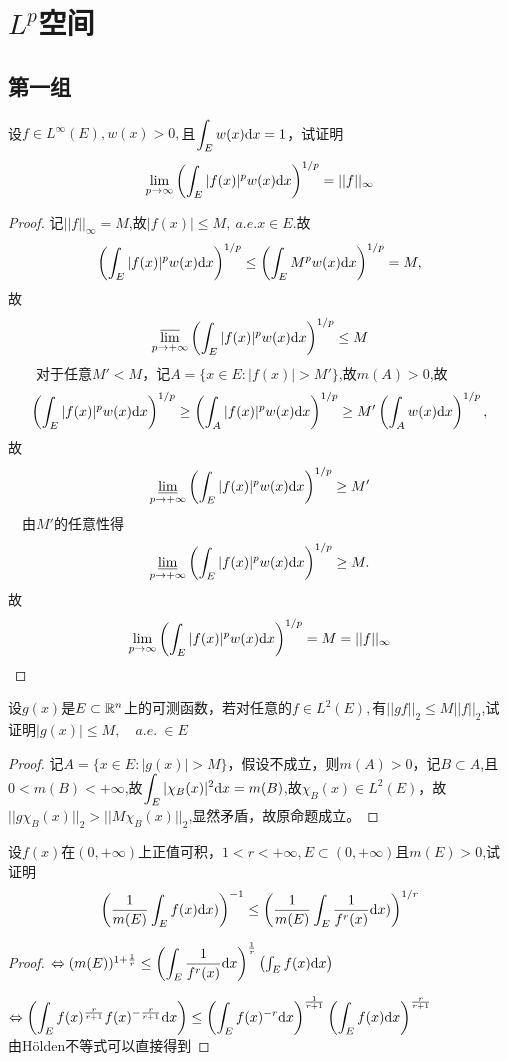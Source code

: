 \chapter{\emph{$L^p$}空间}
\section{第一组}
设$f\in L^{\infty}(E),w(x)>0,$且$\displaystyle{\int_E w(x) \mathrm{d}x=1}$，试证明$$\lim\limits_{p\to \infty}\left( \int_E |f(x)|^p w(x)\mathrm{d}x\right)^{1/p}=||f||_{\infty} $$
\begin{proof}
	记$||f||_{\infty}=M$,故$|f(x)|\leq M,\ a.e. x\in E$.故$$\left( \int_E |f(x)|^pw(x)\mathrm{d}x\right)^{1/p}\leq \left( \int_E M^pw(x)\mathrm{d}x\right)^{1/p}=M,$$故$$\displaystyle{\varlimsup\limits_{p \to +\infty}\left( \int_E |f(x)|^p w(x)\mathrm{d}x\right)^{1/p}\leq M} $$$\qquad $对于任意$M'<M$，记$A=\{x\in E:|f(x)|>M'\}$,故$m(A)>0$,故$$\left( \int_E |f(x)|^p w(x)\mathrm{d}x\right)^{1/p}\geq \left( \int_A |f(x)|^p w(x)\mathrm{d}x\right)^{1/p}\geq M'\left( \int_A  w(x)\mathrm{d}x\right)^{1/p},$$故$$\varliminf\limits_{p \to +\infty}\left( \int_E |f(x)|^p w(x)\mathrm{d}x\right)^{1/p}\geq M'$$$\quad$由$M'$的任意性得$$\varliminf\limits_{p \to +\infty}\left( \int_E |f(x)|^p w(x)\mathrm{d}x\right)^{1/p}\geq M.$$故$$\lim\limits_{p\to \infty}\left( \int_E |f(x)|^p w(x)\mathrm{d}x\right)^{1/p}=M=||f||_{\infty} $$
\end{proof}
设$g(x)$是$E\subset \mathbb{R}^{n}$上的可测函数，若对任意的$f\in L^2(E),$有$||gf||_2\leq M||f||_2$,试证明$|g(x)|\leq M,\quad a.e.\ \in E $
\begin{proof}
	记$A=\{x\in E:|g(x)|>M\}$，假设不成立，则$m(A)>0$，记$B\subset A$,且$0<m(B)<+\infty$,故$\displaystyle{\int_E|\chi_B(x)|^2\mathrm{d}x=m(B)}$,故$\chi_B(x)\in L^2(E)$，故$||g\chi_B(x)||_2> ||M\chi_B(x)||_2$,显然矛盾，故原命题成立。
\end{proof}

设$f(x)$在$(0,+\infty)$上正值可积，$1<r<+\infty, E\subset (0,+\infty)$且$m(E)>0$,试证明$$\left( \displaystyle{\frac{1}{m(E)}\int_E f(x) \mathrm{d}x)}\right)^{-1}\leq  \left( \displaystyle{\frac{1}{m(E)}\int_E \frac{1}{f^r(x)} \mathrm{d}x)}\right)^{1/r}$$
\begin{proof}
	$\Leftrightarrow (m(E))^{1+\frac{1}{r}}\leq \left( \displaystyle{\int_E \frac{1}{f^r(x)}\mathrm{d}x } \right)^{\frac{1}{r}}\left(\int_E f(x)  \mathrm{d}x \right)  $\par 
	$\Leftrightarrow\displaystyle{ \left( \int_E f(x) ^{\frac{r}{r+1}}  f(x) ^{-\frac{r}{r+1}} \mathrm{d}x \right)\leq \left(\int_E  f(x) ^{-r}  \mathrm{d}x \right)^{\frac{1}{r+1}}\left(\int_E f(x)  \mathrm{d}x \right)^{\frac{r}{r+1}}   }$\\
	由H{\"o}lden不等式可以直接得到
\end{proof}




